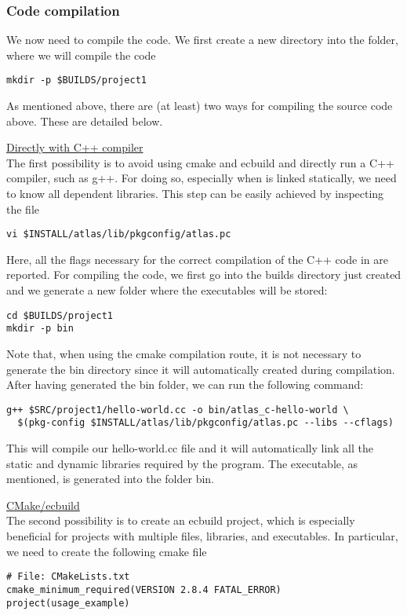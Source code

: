 \subsubsection*{Code compilation}
We now need to compile the code. We first create a new directory
into the  folder, where we will compile the code
%
\begin{lstlisting}[style=BashStyle]
mkdir -p $BUILDS/project1
\end{lstlisting}
%
As mentioned above, there are (at least) two ways for compiling 
the source code above. These are detailed below.
%
\begin{description}
%
\item \underline{Directly with C++ compiler}\\[0.5em]
%
The first possibility is to 
avoid using cmake and ecbuild and directly run a C++ compiler, 
such as g++. For doing so, especially when \Atlas is linked statically,
we need to know all \Atlas dependent libraries. This step can be easily
achieved by inspecting the file 
%
\begin{lstlisting}[style=BashStyle]
vi $INSTALL/atlas/lib/pkgconfig/atlas.pc
\end{lstlisting}
%
Here, all the flags necessary for the correct compilation 
of the C++ code in  are reported. For 
compiling the code, we first go into the builds directory 
just created and we generate a new folder where the executables 
will be stored: 
%
\begin{lstlisting}[style=BashStyle]
cd $BUILDS/project1
mkdir -p bin
\end{lstlisting}
%
Note that, when using the cmake compilation route, it is not 
necessary to generate the bin directory since it will automatically 
created during compilation.
After having generated the bin folder, we can run the following 
command:
%
\begin{lstlisting}[style=BashStyle]
g++ $SRC/project1/hello-world.cc -o bin/atlas_c-hello-world \ 
  $(pkg-config $INSTALL/atlas/lib/pkgconfig/atlas.pc --libs --cflags)
\end{lstlisting}
%
This will compile our hello-world.cc file and it will automatically 
link all the static and dynamic libraries required by the program. 
The executable, as mentioned, is generated into the folder bin.
%
\item \underline{CMake/ecbuild}\\[0.5em]
%
The second possibility is to create an ecbuild project, which is 
especially beneficial for projects with multiple files, libraries,
and executables.
 In particular, we need to create the following 
cmake file
%
\begin{lstlisting}[style=XMLStyle]
# File: CMakeLists.txt
cmake_minimum_required(VERSION 2.8.4 FATAL_ERROR)
project(usage_example)


\end{lstlisting}
\end{description}
